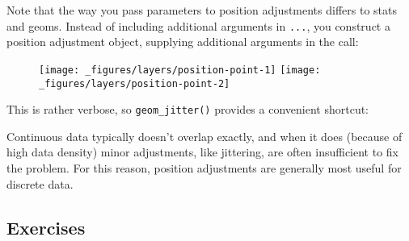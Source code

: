Note that the way you pass parameters to position adjustments differs to
stats and geoms. Instead of including additional arguments in
\texttt{...}, you construct a position adjustment object, supplying
additional arguments in the call:

\begin{Shaded}
\begin{Highlighting}[]
\OperatorTok{+}\StringTok{ }
\StringTok{  }\NormalTok{(} \NormalTok{)}
\OperatorTok{+}\StringTok{ }
\StringTok{  }\NormalTok{(} \NormalTok{(} \NormalTok{, } \NormalTok{))}
\end{Highlighting}
\end{Shaded}

\begin{figure}[H]
  \texttt{[image: \_figures/layers/position-point-1]}%
  \texttt{[image: \_figures/layers/position-point-2]}
\end{figure}

This is rather verbose, so \texttt{geom\_jitter()} provides a convenient
shortcut:

\begin{Shaded}
\begin{Highlighting}[]
\OperatorTok{+}\StringTok{ }
\StringTok{  }\NormalTok{(} \NormalTok{, } \NormalTok{)}
\end{Highlighting}
\end{Shaded}

Continuous data typically doesn't overlap exactly, and when it does
(because of high data density) minor adjustments, like jittering, are
often insufficient to fix the problem. For this reason, position
adjustments are generally most useful for discrete data.

\hypertarget{exercises-4}{%
\subsection{Exercises}\label{exercises-4}}

